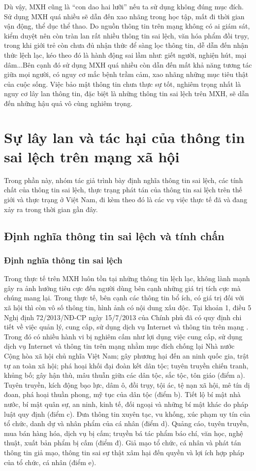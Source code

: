 		Dù vậy, MXH cũng là “con dao hai lưỡi” nếu ta sử dụng không đúng mục đích. Sử dụng MXH quá nhiều sẽ dẫn đến xao nhãng trong học tập, mất đi thời gian vận động, thể dục thể thao. Do nguồn thông tin trên mạng không có ai giám sát, kiểm duyệt nên còn tràn lan rất nhiều thông tin sai lệch, văn hóa phẩm đồi trụy, trong khi giới trẻ còn chưa đủ nhận thức để sàng lọc thông tin, dễ dẫn đến nhận thức lệch lạc, kéo theo đó là hành động sai lầm như: giết người, nghiện hút, mại dâm...Bên cạnh đó sử dụng MXH quá nhiều còn dẫn đến mất khả năng tương tác giữa mọi người, có nguy cơ mắc bệnh trầm cảm, xao nhãng những mục tiêu thật của cuộc sống. Việc bảo mật thông tin chưa thực sự tốt, nghiêm trọng nhất là nguy cơ lây lan thông tin, đặc biệt là những thông tin sai lệch trên MXH, sẽ dẫn đến những hậu quả vô cùng nghiêm trọng.
		
\section{Sự lây lan và tác hại của thông tin sai lệch trên mạng xã hội}
Trong phần này, nhóm tác giả trình bày định nghĩa thông tin sai lệch, các tính chất của thông tin sai lệch, thực trạng phát tán của thông tin sai lệch trên thế giới và thực trạng ở Việt Nam, đi kèm theo đó là các vụ việc thực tế đã và đang xảy ra trong thời gian gần đây.
	\subsection{Định nghĩa thông tin sai lệch và tính chấn}
		\subsubsection{Định nghĩa thông tin sai lệch}
		Trong thực tế trên MXH luôn tồn tại những thông tin lệch lạc, không lành mạnh gây ra ảnh hưởng tiêu cực đến người dùng bên cạnh những giá trị tích cực mà chúng mang lại. Trong thực tế, bên cạnh các thông tin bổ ích, có giá trị đối với xã hội thì còn vô số thông tin, hình ảnh có nội dung xấu độc. Tại khoản 1, điều 5 Nghị định 72/2013/NĐ-CP ngày 15/7/2013 của Chính phủ đã có quy định chi tiết về việc quản lý, cung cấp, sử dụng dịch vụ Internet và thông tin trên mạng \cite{quidinh}. Trong đó có nhiều hành vi bị nghiêm cấm như lợi dụng việc cung cấp, sử dụng dịch vụ Internet và thông tin trên mạng nhằm mục đích chống lại Nhà nước Cộng hòa xã hội chủ nghĩa Việt Nam; gây phương hại đến an ninh quốc gia, trật tự an toàn xã hội; phá hoại khối đại đoàn kết dân tộc; tuyên truyền chiến tranh, khủng bố; gây hận thù, mâu thuẫn giữa các dân tộc, sắc tộc, tôn giáo (điểm a). Tuyên truyền, kích động bạo lực, dâm ô, đồi trụy, tội ác, tệ nạn xã hội, mê tín dị đoan, phá hoại thuần phong, mỹ tục của dân tộc (điểm b). Tiết lộ bí mật nhà nước, bí mật quân sự, an ninh, kinh tế, đối ngoại và những bí mật khác do pháp luật quy định (điểm c). Đưa thông tin xuyên tạc, vu khống, xúc phạm uy tín của tổ chức, danh dự và nhân phẩm của cá nhân (điểm d). Quảng cáo, tuyên truyền, mua bán hàng hóa, dịch vụ bị cấm; truyền bá tác phẩm báo chí, văn học, nghệ thuật, xuất bản phẩm bị cấm (điểm đ). Giả mạo tổ chức, cá nhân và phát tán thông tin giả mạo, thông tin sai sự thật xâm hại đến quyền và lợi ích hợp pháp của tổ chức, cá nhân (điểm e).
		
